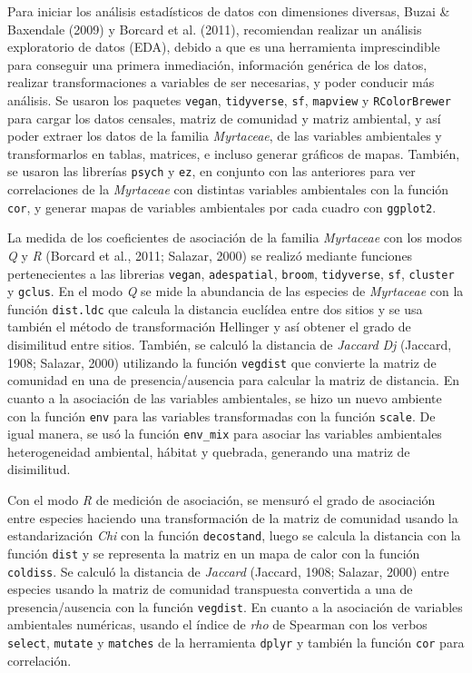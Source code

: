 \documentclass[11pt,]{article}
\begin{document}
Para iniciar los análisis estadísticos de datos con dimensiones
diversas, Buzai \& Baxendale (2009) y Borcard et al. (2011), recomiendan
realizar un análisis exploratorio de datos (EDA), debido a que es una
herramienta imprescindible para conseguir una primera inmediación,
información genérica de los datos, realizar transformaciones a variables
de ser necesarias, y poder conducir más análisis. Se usaron los paquetes
\texttt{vegan}, \texttt{tidyverse}, \texttt{sf}, \texttt{mapview} y
\texttt{RColorBrewer} para cargar los datos censales, matriz de
comunidad y matriz ambiental, y así poder extraer los datos de la
familia \emph{Myrtaceae}, de las variables ambientales y transformarlos
en tablas, matrices, e incluso generar gráficos de mapas. También, se
usaron las librerías \texttt{psych} y \texttt{ez}, en conjunto con las
anteriores para ver correlaciones de la \emph{Myrtaceae} con distintas
variables ambientales con la función \texttt{cor}, y generar mapas de
variables ambientales por cada cuadro con \texttt{ggplot2}.

La medida de los coeficientes de asociación de la familia
\emph{Myrtaceae} con los modos \emph{Q} y \emph{R} (Borcard et al.,
2011; Salazar, 2000) se realizó mediante funciones pertenecientes a las
librerias \texttt{vegan}, \texttt{adespatial}, \texttt{broom},
\texttt{tidyverse}, \texttt{sf}, \texttt{cluster} y \texttt{gclus}. En
el modo \emph{Q} se mide la abundancia de las especies de
\emph{Myrtaceae} con la función \texttt{dist.ldc} que calcula la
distancia euclídea entre dos sitios y se usa también el método de
transformación Hellinger y así obtener el grado de disimilitud entre
sitios. También, se calculó la distancia de \emph{Jaccard} \emph{Dj}
(Jaccard, 1908; Salazar, 2000) utilizando la función \texttt{vegdist}
que convierte la matriz de comunidad en una de presencia/ausencia para
calcular la matriz de distancia. En cuanto a la asociación de las
variables ambientales, se hizo un nuevo ambiente con la función
\texttt{env} para las variables transformadas con la función
\texttt{scale}. De igual manera, se usó la función \texttt{env\_mix}
para asociar las variables ambientales heterogeneidad ambiental, hábitat
y quebrada, generando una matriz de disimilitud.

Con el modo \emph{R} de medición de asociación, se mensuró el grado de
asociación entre especies haciendo una transformación de la matriz de
comunidad usando la estandarización \emph{Chi} con la función
\texttt{decostand}, luego se calcula la distancia con la función
\texttt{dist} y se representa la matriz en un mapa de calor con la
función \texttt{coldiss}. Se calculó la distancia de \emph{Jaccard}
(Jaccard, 1908; Salazar, 2000) entre especies usando la matriz de
comunidad transpuesta convertida a una de presencia/ausencia con la
función \texttt{vegdist}. En cuanto a la asociación de variables
ambientales numéricas, usando el índice de \emph{rho} de Spearman con
los verbos \texttt{select}, \texttt{mutate} y \texttt{matches} de la
herramienta \texttt{dplyr} y también la función \texttt{cor} para
correlación.
\end{document}
